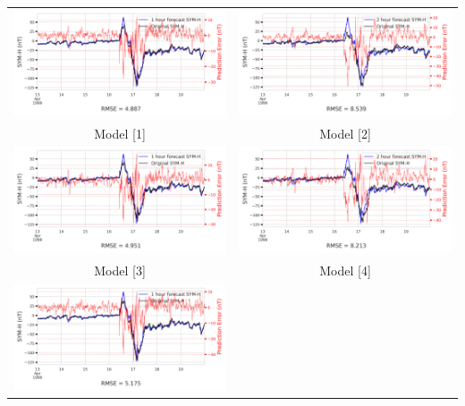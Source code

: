 \documentclass[draft,sw]{agutexSI2019}
\begin{document}
\begin{table}
\centering
\begin{tabular}{cc}
\includegraphics[width=0.49\linewidth]{paper_plots/1h_swics/1h_swics_storm_29.png}
&
\includegraphics[width=0.49\linewidth]{paper_plots/2h_swics/2h_swics_storm_29.png}
\\
Model [1] & Model [2]
\vspace*{12pt}
\\
\includegraphics[width=0.49\linewidth]{paper_plots/1h_no_swics/1h_no_swics_storm_29.png}
&
\includegraphics[width=0.49\linewidth]{paper_plots/2h_no_swics/2h_no_swics_storm_29.png}
\\
Model [3] & Model [4]
\vspace*{12pt}
\\
\includegraphics[width=0.49\linewidth]{paper_plots/1h_swics_model_on_no_swics/1h_swics_model_on_no_swics_storm_29.png}

\end{tabular}
\end{table}
\end{document}
